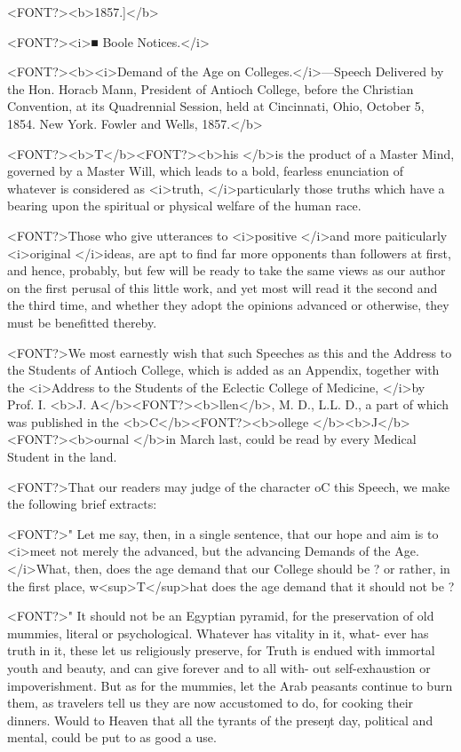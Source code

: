 <FONT?><b>1857.]</b>

<FONT?><i>■ Boole Notices.</i>

<FONT?><b><i>Demand of the Age on Colleges.</i>---Speech Delivered by the Hon. Horacb Mann, President of
Antioch College, before the Christian Convention, at its Quadrennial Session, held at
Cincinnati, Ohio, October 5, 1854.   New York.   Fowler and Wells, 1857.</b>

<FONT?><b>T</b><FONT?><b>his </b>is the product of a Master Mind, governed by a Master Will,
which leads to a bold, fearless enunciation of whatever is considered as
<i>truth, </i>particularly those truths which have a bearing upon the spiritual
or physical welfare of the human race.

<FONT?>Those who give utterances to <i>positive </i>and more paiticularly <i>original
</i>ideas, are apt to find far more opponents than followers at first, and
hence, probably, but few will be ready to take the same views as our
author on the first perusal of this little work, and yet most will read it
the second and the third time, and whether they adopt the opinions
advanced or otherwise, they must be benefitted thereby.

<FONT?>We most earnestly wish that such Speeches as this and the Address
to the Students of Antioch College, which is added as an Appendix,
together with the <i>Address to the Students of the Eclectic College of
Medicine, </i>by Prof. I. <b>J. A</b><FONT?><b>llen</b>, M. D., L.L. D., a part of which was
published in the <b>C</b><FONT?><b>ollege </b><b>J</b><FONT?><b>ournal </b>in March last, could be read by every
Medical Student in the land.

<FONT?>That our readers may judge of the character oC this Speech, we
make the following brief extracts:

<FONT?>" Let me say, then, in a single sentence, that our hope and aim is to
<i>meet not merely the advanced, but the advancing Demands of the Age.
</i>What, then, does the age demand that our College should be ? or rather,
in the first place, w<sup>T</sup>hat does the age demand that it should not be ?

<FONT?>" It should not be an Egyptian pyramid, for the preservation of old
mummies, literal or psychological. Whatever has vitality in it, what-
ever has truth in it, these let us religiously preserve, for Truth is endued
with immortal youth and beauty, and can give forever and to all with-
out self-exhaustion or impoverishment. But as for the mummies, let
the Arab peasants continue to burn them, as travelers tell us they are
now accustomed to do, for cooking their dinners. Would to Heaven
that all the tyrants of the preseŋt day, political and mental, could be
put to as good a use.

